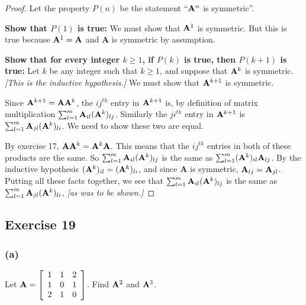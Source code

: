 \documentclass[14pt]{extarticle}
\begin{document}
\begin{proof}
    Let the property \(P(n)\) be the statement ``\({\bf A}^n\) is symmetric''.

    {\bf Show that \(P(1)\) is true:} We must show that \({\bf A}^1\) is symmetric. But this is true because
    \({\bf A}^1 = {\bf A}\) and {\bf A} is symmetric by assumption.

        {\bf Show that for every integer \(k \geq 1\), if \(P(k)\) is true, then \(P(k + 1)\) is true:} Let \(k\) be any integer
    such that \(k \geq 1\), and suppose that \({\bf A}^k\) is symmetric. {\it [This is the inductive hypothesis.]}
    We must show that \({\bf A}^{k+1}\) is symmetric.

    Since \({\bf A}^{k+1} = {\bf A}{\bf A}^k\), the \(ij^{th}\) entry in \({\bf A}^{k+1}\) is, by definition of matrix
    multiplication \(\sum_{l=1}^m {\bf A}_{il} ({\bf A}^k)_{lj}\). Similarly the \(ji^{th}\) entry in \({\bf A}^{k+1}\) is
    \(\sum_{l=1}^m {\bf A}_{jl} ({\bf A}^k)_{li}\). We need to show these two are equal.

    By exercise 17, \({\bf A}{\bf A}^k = {\bf A}^k{\bf A}\). This means that the \(ij^{th}\) entries in both of these products
    are the same. So \(\sum_{l=1}^m{\bf A}_{il} ({\bf A}^k)_{lj}\) is the same as \(\sum_{l=1}^m ({\bf A}^k)_{il}{\bf A}_{lj}\).
    By the inductive hypothesis \(({\bf A}^k)_{il} = ({\bf A}^k)_{li}\), and since {\bf A} is symmetric, \({\bf A}_{lj} =
        {\bf A}_{jl}\). Putting all these facts together, we see that \(\sum_{l=1}^m {\bf A}_{il} ({\bf A}^k)_{lj}\) is the same as
    \(\sum_{l=1}^m {\bf A}_{jl} ({\bf A}^k)_{li}\), {\it [as was to be shown.]}
\end{proof}

\subsection{Exercise 19}
\subsubsection{(a)}
Let \({\bf A} =
\left[
    \begin{array}{rrr}
        1 & 1 & 2 \\
        1 & 0 & 1 \\
        2 & 1 & 0 \\
    \end{array}
    \right]
\). Find \({\bf A}^2\) and \({\bf A}^3\).
\end{document}
